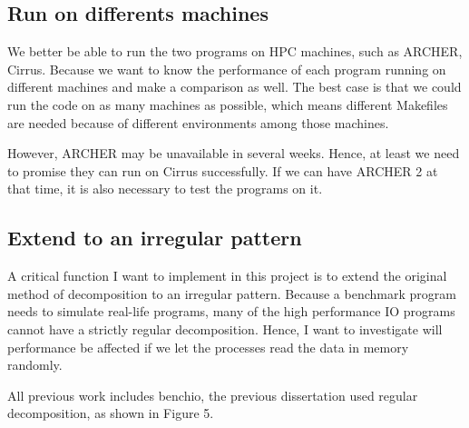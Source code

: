 \documentclass{article}
\begin{document}
\subsection{Run on differents machines}
We better be able to run the two programs on HPC machines, such as ARCHER, Cirrus. Because we want to know the performance of each program running on different machines and make a comparison as well.
The best case is that we could run the code on as many machines as possible, which means different Makefiles are needed because of different environments among those machines.

However, ARCHER may be unavailable in several weeks. Hence, at least we need to promise they can run on Cirrus successfully. If we can have ARCHER 2 at that time, it is also necessary to test the programs on it.


\subsection{Extend to an irregular pattern}
A critical function I want to implement in this project is to extend the original method of decomposition to an irregular pattern. Because a benchmark program needs to simulate real-life programs, many of the high performance IO programs cannot have a strictly regular decomposition. Hence, I want to investigate will performance be affected if we let the processes read the data in memory randomly.

All previous work includes benchio, the previous dissertation used regular decomposition, as shown in Figure 5.
 
\end{document}
